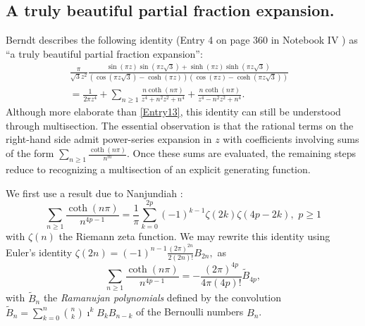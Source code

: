 \documentclass[11pt,oneside,reqno]{article}
\theoremstyle{definition}
\begin{document}
\subsection{A truly beautiful partial fraction expansion.}
Berndt describes the following identity (Entry 4 on page 360 in Notebook IV \cite{R4}) as ``a truly beautiful partial fraction expansion'':
\begin{align}
\label{truly}
\frac{\pi}{\sqrt{3}z^{2}}\frac{\sin\left(\pi z\right)\sin\left(\pi z\sqrt{3}\right)+\sinh\left(\pi z\right)\sinh\left(\pi z\sqrt{3}\right)}{\left(\cos\left(\pi z\sqrt{3}\right)-\cosh\left(\pi z\right)\right)\left(\cos\left(\pi z\right)-\cosh\left(\pi z\sqrt{3}\right)\right)}&\nonumber\\    
=\frac{1}{2\pi z^{4}}+\sum_{n\ge1}\frac{n\coth\left(n\pi\right)}{z^{4}+n^{2}z^{2}+n^{4}}+\frac{n\coth\left(n\pi\right)}{z^{4}-n^{2}z^{2}+n^{4}}.
\end{align}
Although more elaborate than \eqref{Entry13}, this identity can still be understood through multisection. The essential observation is that the rational terms on the right-hand side admit power-series expansion in $z$ with coefficients involving sums of the form $\sum_{n\ge1}\frac{\coth(n\pi)}{n^m}$. Once these sums are evaluated, the remaining steps reduce to recognizing a multisection of an explicit generating function.

We first use a result due to Nanjundiah \cite{Nanjundiah}:
\begin{equation}
\label{Nanjundiah}
\sum_{n\ge1}\frac{\coth\left(n\pi\right)}{n^{4p-1}}=\frac{1}{\pi}\sum_{k=0}^{2p}\left(-1\right)^{k-1}\zeta\left(2k\right)\zeta\left(4p-2k\right),\,\,p\ge1
\end{equation}
with $\zeta(n)$ the Riemann zeta function.  We may rewrite this identity using Euler's identity
$
\zeta\left(2n\right)=\left(-1\right)^{n-1}\frac{\left(2\pi\right)^{2n}}{2\left(2n\right)!}B_{2n},
$
as
\[
\sum_{n\ge1}\frac{\coth\left(n\pi\right)}{n^{4p-1}}=-\frac{\left(2\pi\right)^{4p}}{4\pi\left(4p\right)!}\tilde{B}_{4p},
\]
with $\tilde{B}_{n}$ the \textit{Ramanujan polynomials} defined by the convolution
$
\tilde{B}_{n}
=\sum_{k=0}^n \binom{n}{k}\imath^k B_k B_{n-k}
$
of the Bernoulli numbers $B_n$. 
\end{document}
